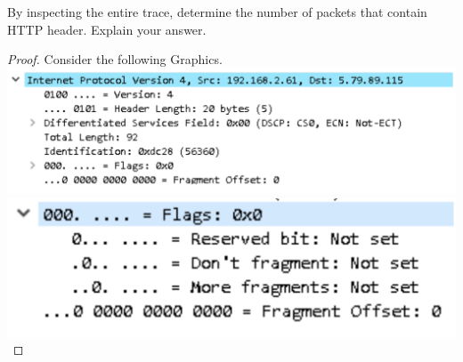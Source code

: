 \documentclass[../../main.tex]{subfiles}
\begin{document}
\begin{wts}
By inspecting the entire trace, determine the number of packets that contain HTTP header. Explain your answer.
\end{wts}
\begin{proof}
Consider the following Graphics.\\
\includegraphics[width=\textwidth]{subfiles/images/PART1_Q6.png}
\includegraphics[width=\textwidth]{subfiles/images/PART1_Q7.png}

\end{proof}
\end{document}
